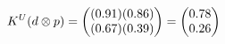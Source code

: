 \documentclass[preview]{standalone}
\begin{document}
\begin{align*}
\special{dvisvgm:raw <g id='unique000'>}K^U(d \otimes p) = \begin{pmatrix} (0.91)(0.86) \\ (0.67)(0.39) \end{pmatrix} = \begin{pmatrix} 0.78 \\ 0.26 \end{pmatrix}\special{dvisvgm:raw </g>}
\end{align*}
\end{document}
